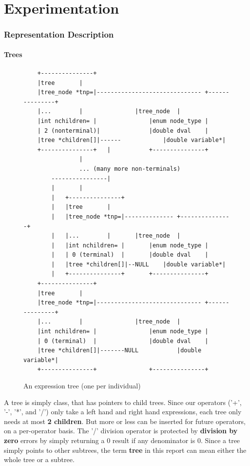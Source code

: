 \documentclass[12pt]{article}
\begin{document}
\part{Experimentation}

\section{Representation Description}
\subsection{Trees}
\label{sec:trees}
\begin{figure}[!h]
        \begin{center}
		\scriptsize
		\begin{lstlisting}
	+---------------+
	|tree		|
	|tree_node *tnp=|------------------------------ +---------------+
	|...		|				|tree_node	|
	|int nchildren= |				|enum node_type	|
	| 2 (nonterminal)|				|double dval	|
	|tree *children[]|------			|double variable*|
	+---------------+	|			+---------------+
				|
				... (many more non-terminals)
		----------------|
		|		|
		|	+---------------+
		|	|tree		|
		|	|tree_node *tnp=|-------------- +---------------+
		|	|...		|		|tree_node	|
		|	|int nchildren= |		|enum node_type	|
		|	| 0 (terminal)	|		|double dval	|
		|	|tree *children[]|--NULL	|double variable*|
		|	+---------------+		+---------------+
	+---------------+
	|tree		|
	|tree_node *tnp=|------------------------------ +---------------+
	|...		|				|tree_node	|
	|int nchildren= |				|enum node_type	|
	| 0 (terminal)	|				|double dval	|
	|tree *children[]|-------NULL			|double variable*|
	+---------------+				+---------------+
		\end{lstlisting}
		\normalsize
               \caption{An expression tree (one per individual)}
                \label{tree_rep}
        \end{center}
\end{figure}

A tree is simply class, that has pointers to child trees. Since our operators ('+', '-', '*', and '/') only take a left hand and right hand expressions, each tree only needs at most \textbf{2 children}. But more or less can be inserted for future operators, on a per-operator basis. The '/' division operator is protected by \textbf{division by zero} errors by simply returning a 0 result if any denominator is 0. Since a tree simply points to other subtrees, the term \textbf{tree} in this report can mean either the whole tree or a subtree.
\end{document}
